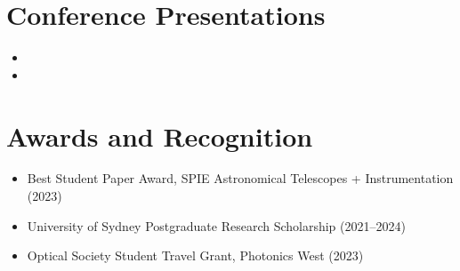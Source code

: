 \section*{Conference Presentations}
\begin{itemize}%
	\item {}
	
	\item {}
\end{itemize}

\section*{Awards and Recognition}
\begin{itemize}%
	\item Best Student Paper Award, SPIE Astronomical Telescopes + Instrumentation (2023)
	\item University of Sydney Postgraduate Research Scholarship (2021--2024)
	\item Optical Society Student Travel Grant, Photonics West (2023)
\end{itemize}





\citereset